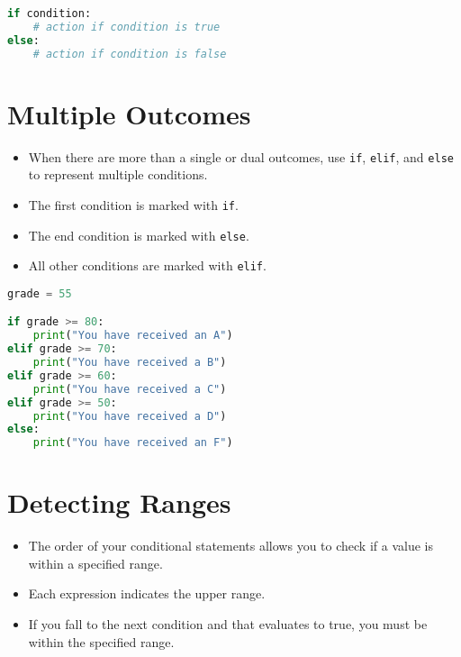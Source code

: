 \documentclass{article}
\begin{document}
\begin{lstlisting}[language=Python]
if condition:
    # action if condition is true
else:
    # action if condition is false
\end{lstlisting}

\section{Multiple Outcomes}
\begin{itemize}
    \item When there are more than a single or dual outcomes, use \texttt{if}, \texttt{elif}, and \texttt{else} to represent multiple conditions.
    \item The first condition is marked with \texttt{if}.
    \item The end condition is marked with \texttt{else}.
    \item All other conditions are marked with \texttt{elif}.
\end{itemize}

\begin{lstlisting}[language=Python]
grade = 55

if grade >= 80:
    print("You have received an A")
elif grade >= 70:
    print("You have received a B")
elif grade >= 60:
    print("You have received a C")
elif grade >= 50:
    print("You have received a D")
else:
    print("You have received an F")
\end{lstlisting}

\section{Detecting Ranges}
\begin{itemize}
    \item The order of your conditional statements allows you to check if a value is within a specified range.
    \item Each expression indicates the upper range.
    \item If you fall to the next condition and that evaluates to true, you must be within the specified range.
\end{itemize}
\end{document}
